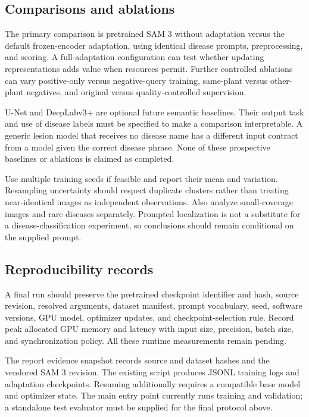 \subsection{Comparisons and ablations}
The primary comparison is pretrained SAM 3 without adaptation versus the default frozen-encoder adaptation, using identical disease prompts, preprocessing, and scoring. A full-adaptation configuration can test whether updating representations adds value when resources permit. Further controlled ablations can vary positive-only versus negative-query training, same-plant versus other-plant negatives, and original versus quality-controlled supervision.

U-Net and DeepLabv3+ are optional future semantic baselines. Their output task and use of disease labels must be specified to make a comparison interpretable. A generic lesion model that receives no disease name has a different input contract from a model given the correct disease phrase. None of these prospective baselines or ablations is claimed as completed.

Use multiple training seeds if feasible and report their mean and variation. Resampling uncertainty should respect duplicate clusters rather than treating near-identical images as independent observations. Also analyze small-coverage images and rare diseases separately. Prompted localization is not a substitute for a disease-classification experiment, so conclusions should remain conditional on the supplied prompt.

\subsection{Reproducibility records}
A final run should preserve the pretrained checkpoint identifier and hash, source revision, resolved arguments, dataset manifest, prompt vocabulary, seed, software versions, GPU model, optimizer updates, and checkpoint-selection rule. Record peak allocated GPU memory and latency with input size, precision, batch size, and synchronization policy. All these runtime measurements remain pending.

The report evidence snapshot records source and dataset hashes and the vendored SAM 3 revision. The existing script produces JSONL training logs and adaptation checkpoints. Resuming additionally requires a compatible base model and optimizer state. The main entry point currently runs training and validation; a standalone test evaluator must be supplied for the final protocol above.
